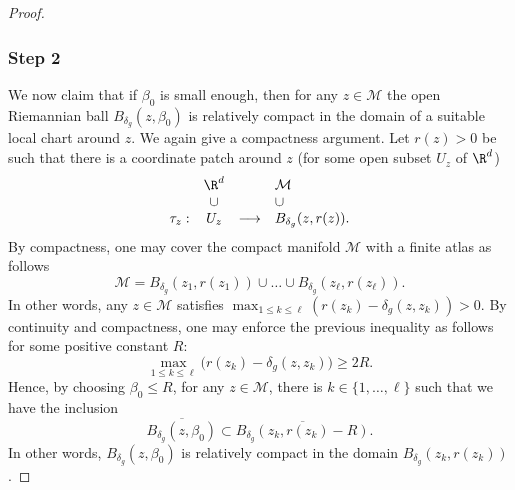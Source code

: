 \begin{proof}
\subsubsection*{Step 2} We now claim that if $\beta_0$ is small enough, then for any $z\in \mathcal{M}$ the open Riemannian ball $B_{\delta_g}(z,\beta_0)$ is relatively compact in the domain of a suitable local chart around $z$.
We again give a compactness argument.
Let $r(z)>0$ be such that there is a coordinate patch around $z$ (for some open subset $U_z$ of $\R^d$)
\begin{equation*}
\begin{array}{rccl}
& \R^d & & \mathcal{M} \\
& \cup & & \cup \\
\tau_z:&U_z& \longrightarrow & B_{\delta_g}(z,r(z)).
\end{array}
\end{equation*}
By compactness, one may cover the compact manifold $\mathcal{M}$ with a finite atlas as follows
\begin{equation*}
\mathcal{M}=B_{\delta_g}(z_1,r(z_1))\cup \dots \cup B_{\delta_g}(z_\ell,r(z_\ell)).
\end{equation*}
In other words, any $z\in \mathcal{M}$ satisfies $
\max_{1\leq k\leq \ell}(r(z_k)-\delta_g(z,z_k))>0$. By continuity and compactness, one may enforce the previous inequality as follows for some positive constant $R$:
\begin{equation*}
\max_{1\leq k\leq \ell}\bigl(r(z_k)-\delta_g(z,z_k)\bigr)\geq 2R.
\end{equation*}
Hence, by choosing $\beta_0\leq R$, for any $z\in \mathcal{M}$, there is $k\in \{1,\dots,\ell\}$ such that we have the inclusion
\begin{equation*}
\overline{B_{\delta_g}(z,\beta_0)}\subset \overline{B_{\delta_g}(z_k,r(z_k)-R)}.
\end{equation*}
In other words, $B_{\delta_g}(z,\beta_0)$ is relatively compact in the domain $B_{\delta_g}(z_k,r(z_k))$.


\end{proof}
